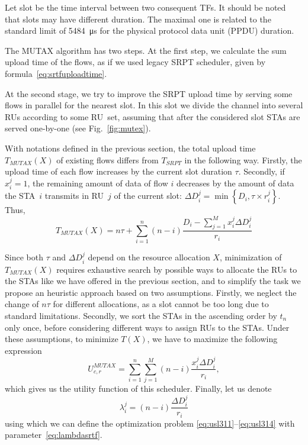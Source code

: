Let slot be the time interval between two consequent TFs.
It should be noted that slots may have different duration. The maximal one is related to the standard limit of \SI{5484}{\us} for the physical protocol data unit (PPDU) duration.

The MUTAX algorithm has two steps. At the first step, we calculate the sum upload time of the flows, as if we used legacy SRPT scheduler, given by formula~\eqref{eq:srtfuploadtime}.

At the second stage, we try to improve the SRPT upload time by serving some flows in parallel for the nearest slot.
In this slot we divide the channel into several RUs according to some RU~set, assuming that after the considered slot STAs are served one-by-one (see Fig.~\ref{fig:mutex}).

With notations defined in the previous section, the total upload time $T_{MUTAX}\left(X\right)$ of existing flows differs from $T_{SRPT}$ in the following way.
Firstly, the upload time of each flow increases by the current slot duration $\tau$.
Secondly, if $x_i^j=1$, the remaining amount of data of flow $i$ decreases by the amount of data the STA~$i$ transmits in RU~$j$ of the current slot: $\Delta D_i^j = \min\left\{D_i, \tau \times r_{i}^{j}\right\}$.
Thus,  
\begin{equation}
\label{eq:mutax_time}
T_{MUTAX}\left(X\right) = n \tau + \sum_{i = 1}^{n} \left(n - i\right) \frac{D_i -  \sum_{j = 1}^{M} x_i^j \Delta D_i^j}{r_{i}}
\end{equation}

Since both $\tau$ and  $\Delta D_i^j$ depend on the resource allocation $X$, minimization of $T_{MUTAX}(X)$ requires exhaustive search by possible ways to allocate the RUs to the STAs like we have offered in the previous section, and to simplify the task we propose an heuristic approach based on two assumptions.
Firstly, we neglect the change of $n \tau$ for different allocations, as a slot cannot be too long due to standard limitations.
Secondly, we sort the STAs in the ascending order by $t_n$ only once, before considering different ways to assign RUs to the STAs.
Under these assumptions, to minimize  $T(X)$, we have to maximize the following expression 
\begin{equation}
\label{eq:11axsrtfutility}
U_{c,r}^{MUTAX} = 
\sum_{i = 1}^{n} \sum_{j = 1}^{M } \left(n - i\right) \frac{x_i^j \Delta D_i^j}{r_{i}},
\end{equation}
which gives us the utility function of this scheduler. Finally, let us denote 
\begin{equation}
\label{eq:lambdasrtf}
\lambda_i^j = \left(n - i\right) \frac{\Delta D_i^j}{r_{i}}
\end{equation}
using which we can define the optimization problem \eqref{eq:usl311}--\eqref{eq:usl314} with parameter~\eqref{eq:lambdasrtf}.

